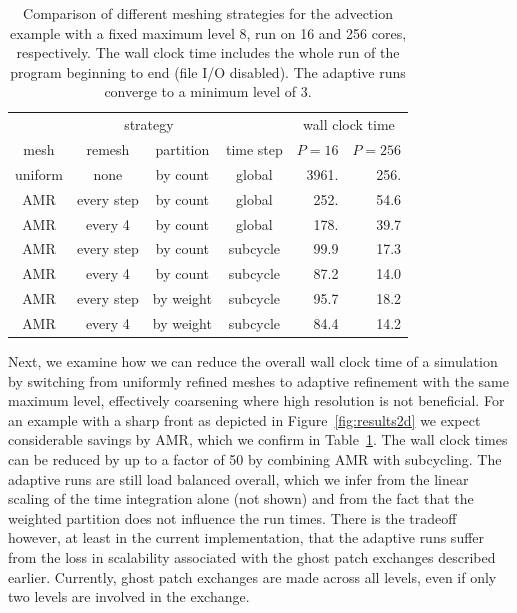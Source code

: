 \documentclass{IOS-Book-Article}     %
\newcommand{\Fig}[1]{Figure~\ref{fig:#1}}
\newcommand{\Tab}[1]{Table~\ref{tab:#1}}
\begin{document}
\begin{table}
  \begin{center}
    \begin{tabular}{cccc|rr}
      \multicolumn{4}{c|}{strategy} & \multicolumn{2}{c}{wall clock time} \\
      mesh & remesh & partition & time step & $P = 16$ & $P = 256$ \\
      \hline
      uniform & none       & by count  & global   & 3961.  & 256.  \\
      \hline
          AMR & every step & by count  & global   &  252.  &  54.6 \\
          AMR & every 4    & by count  & global   &  178.  &  39.7 \\
      \hline
          AMR & every step & by count  & subcycle &   99.9 &  17.3 \\
          AMR & every 4    & by count  & subcycle &   87.2 &  14.0 \\
      \hline
          AMR & every step & by weight & subcycle &   95.7 &  18.2 \\
          AMR & every 4    & by weight & subcycle &   84.4 & 14.2 \\
      \hline
    \end{tabular}
  \end{center}
\caption{Comparison of different meshing strategies for the advection example
  with a fixed maximum level 8, run on 16 and 256 cores, respectively.  The
  wall clock time includes the whole run of the program beginning to end (file
  I/O disabled).  The adaptive runs converge to a minimum level of 3.}
\label{tab:swirlwall}
\end{table}
Next, we examine how we can reduce the overall wall clock time of a simulation
by switching from uniformly refined meshes to adaptive refinement with the same maximum level,
effectively coarsening where high resolution is not beneficial.  For an example
with a sharp front as depicted in \Fig{results2d} we expect considerable
savings by AMR, which we confirm in \Tab{swirlwall}.  The wall clock times can
be reduced by up to a factor of 50 by combining AMR with subcycling.  The
adaptive runs are still  load balanced overall, which we infer from
the linear scaling of the time integration alone (not shown) and from the fact
that the weighted partition does not influence the run times.  There is the
tradeoff however, at least in the current implementation, that the adaptive
runs suffer from the loss in scalability associated with the ghost patch exchanges
described earlier. Currently, ghost patch exchanges are made across all levels, even
if only two levels are involved in the exchange.
\end{document}

